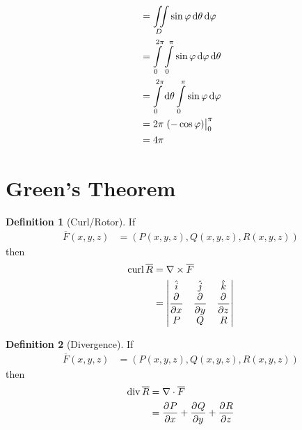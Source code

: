 \documentclass[fleqn, a4paper, 12pt, twoside]{article}
\theoremstyle{definition}
\newtheorem{definition}{Definition}
\theoremstyle{theorem}
\newcommand{\curl}{\mathrm{curl\,}}
\newcommand{\divergence}{\mathrm{div\,}}
\begin{document}
{\begin{solution}
\begin{align*}
                                                                   & = \iint\limits_{D} \sin \varphi \dif \theta \dif \varphi                                                                                               \\
                                                                   & = \int\limits_{0}^{2 \pi} \int\limits_{0}^{\pi} \sin \varphi \dif \varphi \dif \theta                                                                  \\
                                                                   & = \int\limits_{0}^{2 \pi} \dif \theta \int\limits_{0}^{\pi} \sin \varphi \dif \varphi                                                                  \\
                                                                   & = 2 \pi \left. \left( -\cos \varphi \right) \right|_{0}^{\pi}                                                                                          \\
                                                                   & = 4 \pi
	\end{align*}
\end{solution}

\section{Green's Theorem}

\begin{definition}[Curl/Rotor]
	If
	\begin{align*}
		\overline{F}(x,y,z) & = \left( P(x,y,z) , Q(x,y,z) , R(x,y,z) \right)
	\end{align*}
	then
	\begin{align*}
		\curl \overline{R} &= \nabla \times \overline{F}\\
		                &=
			\begin{vmatrix}
				\hat{i}   & \hat{j}   & \hat{k}   \\
				\dpd{}{x} & \dpd{}{y} & \dpd{}{z} \\
				P         & Q         & R
			\end{vmatrix}
	\end{align*}
\end{definition}

\begin{definition}[Divergence]
	If
	\begin{align*}
		\overline{F}(x,y,z) & = \left( P(x,y,z) , Q(x,y,z) , R(x,y,z) \right)
	\end{align*}
	then
	\begin{align*}
		\divergence \overline{R} & = \nabla \cdot \overline{F} \\
                                  & = \dpd{P}{x} + \dpd{Q}{y} + \dpd{R}{z}
	\end{align*}
\end{definition}

}
\end{document}
